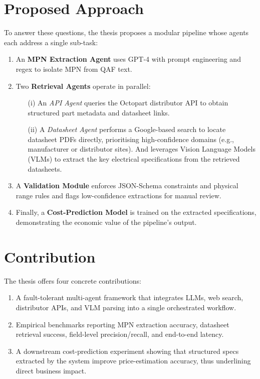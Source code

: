 \section{Proposed Approach }
To answer these questions, the thesis proposes a modular pipeline whose agents each address a single sub-task:  
\begin{enumerate}
  \item An \textbf{MPN Extraction Agent} uses GPT-4 with prompt engineering and regex to isolate MPN from QAF text.  
  \item Two \textbf{Retrieval Agents} operate in parallel:
    \begin{itemize}
      \item[(i)] An \emph{API Agent} queries the Octopart distributor API to obtain structured part metadata and datasheet links.
      \item[(ii)] A \emph{Datasheet Agent} performs a Google-based search to locate datasheet PDFs directly, prioritising high-confidence domains (e.g., manufacturer or distributor sites). And leverages Vision Language Models (VLMs) to extract the key electrical specifications from the retrieved datasheets.
    \end{itemize}
  \item A \textbf{Validation Module} enforces JSON-Schema constraints and physical range rules and flags low-confidence extractions for manual review.  
  \item Finally, a \textbf{Cost-Prediction Model} is trained on the extracted specifications, demonstrating the economic value of the pipeline’s output.
\end{enumerate}

\section{Contribution }
The thesis offers four concrete contributions:
\begin{enumerate}
  \item A fault-tolerant multi-agent framework that integrates LLMs, web search, distributor APIs, and VLM parsing into a single orchestrated workflow.  
  \item Empirical benchmarks reporting MPN extraction accuracy, datasheet retrieval success, field-level precision/recall, and end-to-end latency.  
  \item A downstream cost-prediction experiment showing that structured specs extracted by the system improve price-estimation accuracy, thus underlining direct business impact.
\end{enumerate}

